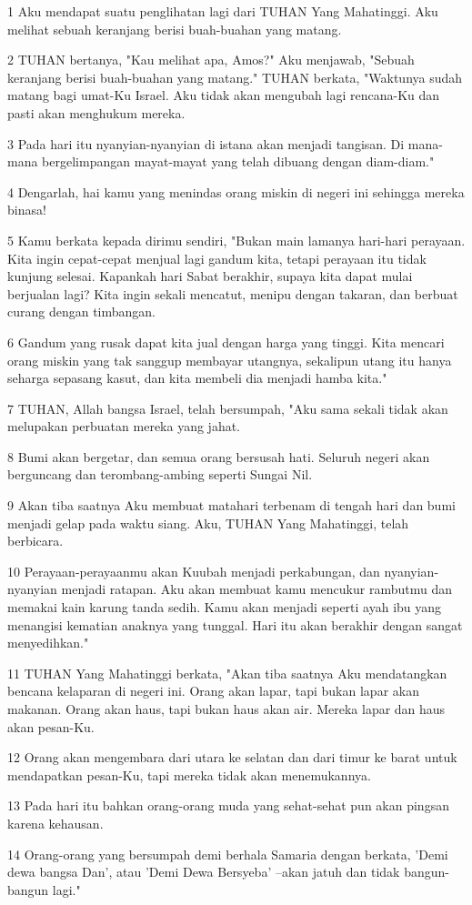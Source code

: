 \par 1 Aku mendapat suatu penglihatan lagi dari TUHAN Yang Mahatinggi. Aku melihat sebuah keranjang berisi buah-buahan yang matang.
\par 2 TUHAN bertanya, "Kau melihat apa, Amos?" Aku menjawab, "Sebuah keranjang berisi buah-buahan yang matang." TUHAN berkata, "Waktunya sudah matang bagi umat-Ku Israel. Aku tidak akan mengubah lagi rencana-Ku dan pasti akan menghukum mereka.
\par 3 Pada hari itu nyanyian-nyanyian di istana akan menjadi tangisan. Di mana-mana bergelimpangan mayat-mayat yang telah dibuang dengan diam-diam."
\par 4 Dengarlah, hai kamu yang menindas orang miskin di negeri ini sehingga mereka binasa!
\par 5 Kamu berkata kepada dirimu sendiri, "Bukan main lamanya hari-hari perayaan. Kita ingin cepat-cepat menjual lagi gandum kita, tetapi perayaan itu tidak kunjung selesai. Kapankah hari Sabat berakhir, supaya kita dapat mulai berjualan lagi? Kita ingin sekali mencatut, menipu dengan takaran, dan berbuat curang dengan timbangan.
\par 6 Gandum yang rusak dapat kita jual dengan harga yang tinggi. Kita mencari orang miskin yang tak sanggup membayar utangnya, sekalipun utang itu hanya seharga sepasang kasut, dan kita membeli dia menjadi hamba kita."
\par 7 TUHAN, Allah bangsa Israel, telah bersumpah, "Aku sama sekali tidak akan melupakan perbuatan mereka yang jahat.
\par 8 Bumi akan bergetar, dan semua orang bersusah hati. Seluruh negeri akan berguncang dan terombang-ambing seperti Sungai Nil.
\par 9 Akan tiba saatnya Aku membuat matahari terbenam di tengah hari dan bumi menjadi gelap pada waktu siang. Aku, TUHAN Yang Mahatinggi, telah berbicara.
\par 10 Perayaan-perayaanmu akan Kuubah menjadi perkabungan, dan nyanyian-nyanyian menjadi ratapan. Aku akan membuat kamu mencukur rambutmu dan memakai kain karung tanda sedih. Kamu akan menjadi seperti ayah ibu yang menangisi kematian anaknya yang tunggal. Hari itu akan berakhir dengan sangat menyedihkan."
\par 11 TUHAN Yang Mahatinggi berkata, "Akan tiba saatnya Aku mendatangkan bencana kelaparan di negeri ini. Orang akan lapar, tapi bukan lapar akan makanan. Orang akan haus, tapi bukan haus akan air. Mereka lapar dan haus akan pesan-Ku.
\par 12 Orang akan mengembara dari utara ke selatan dan dari timur ke barat untuk mendapatkan pesan-Ku, tapi mereka tidak akan menemukannya.
\par 13 Pada hari itu bahkan orang-orang muda yang sehat-sehat pun akan pingsan karena kehausan.
\par 14 Orang-orang yang bersumpah demi berhala Samaria dengan berkata, 'Demi dewa bangsa Dan', atau 'Demi Dewa Bersyeba' --akan jatuh dan tidak bangun-bangun lagi."

